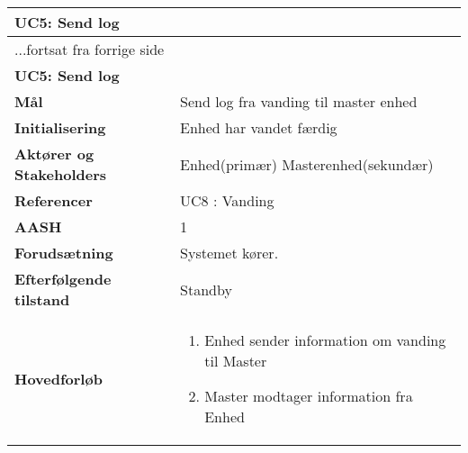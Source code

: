 \begin{center} \centering \label{UC5}
	\begin{longtable}{|p{5cm}|p{9cm}|}  %
	\hline
		\multicolumn{2}{|l|}{\textbf{UC5: Send log}} \\\hline %
		\endfirsthead
		
		\multicolumn{2}{l}{...fortsat fra forrige side} \\ \hline %
		\multicolumn{2}{|l|}{\textbf{UC5: Send log}} \\\hline %
		\endhead	
		
		\textbf{Mål}								&Send log fra vanding til master enhed	\\\hline
		\textbf{Initialisering}					&Enhed har vandet færdig		\\\hline
		\textbf{Aktører og Stakeholders}			&Enhed(primær) 				\newline
												 Masterenhed(sekundær)		\\\hline
		\textbf{Referencer}						&UC8	: Vanding				\\\hline
		\textbf{AASH}							&1							\\\hline
		\textbf{Forudsætning}					&Systemet kører.				\\\hline
		\textbf{Efterfølgende tilstand}			&Standby						\\\hline
		\textbf{Hovedforløb}					
			&\begin{enumerate}
	
				\item Enhed sender information om vanding til Master
				\item Master modtager information fra Enhed
	
			\end{enumerate}\\\hline
	\end{longtable} 
\end{center}

